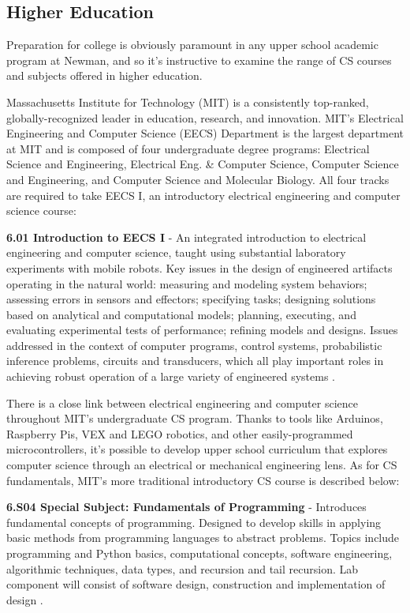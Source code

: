\subsection{Higher Education}
Preparation for college is obviously paramount in any upper school academic program at Newman, and so it's instructive to examine the range of CS courses and subjects offered in higher education. \par
{}
Massachusetts Institute for Technology (MIT) is a consistently top-ranked, globally-recognized leader in education, research, and innovation. MIT's Electrical Engineering and Computer Science (EECS) Department is the largest department at MIT and is composed of four undergraduate degree programs: Electrical Science and Engineering, Electrical Eng. \& Computer Science, Computer Science and Engineering, and Computer Science and Molecular Biology. All four tracks are required to take EECS I, an introductory electrical engineering and computer science course:
\begin{blockquote}
\textbf{6.01 Introduction to EECS I} - An integrated introduction to electrical engineering and computer science, taught using substantial laboratory experiments with mobile robots. Key issues in the design of engineered artifacts operating in the natural world: measuring and modeling system behaviors; assessing errors in sensors and effectors; specifying tasks; designing solutions based on analytical and computational models; planning, executing, and evaluating experimental tests of performance; refining models and designs. Issues addressed in the context of computer programs, control systems, probabilistic inference problems, circuits and transducers, which all play important roles in achieving robust operation of a large variety of engineered systems \cite{mit}.
\end{blockquote}
There is a close link between electrical engineering and computer science throughout MIT's undergraduate CS program. Thanks to tools like Arduinos, Raspberry Pis, VEX and LEGO robotics, and other easily-programmed microcontrollers, it's possible to develop upper school curriculum that explores computer science through an electrical or mechanical engineering lens. As for CS fundamentals, MIT's more traditional introductory CS course is described below:
\begin{blockquote}
	\textbf{6.S04 Special Subject: Fundamentals of Programming} - Introduces fundamental concepts of programming. Designed to develop skills in applying basic methods from programming languages to abstract problems. Topics include programming and Python basics, computational concepts, software engineering, algorithmic techniques, data types, and recursion and tail recursion. Lab component will consist of software design, construction and implementation of design \cite{mit}. 
	\end{blockquote} \par

